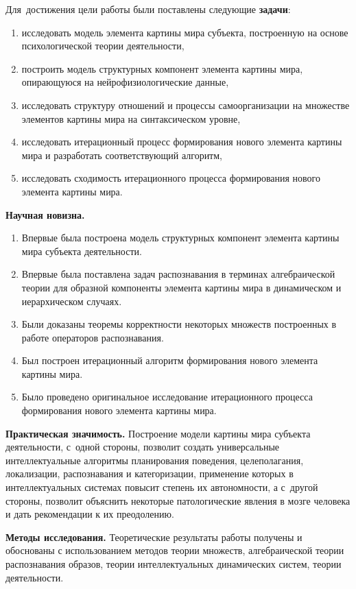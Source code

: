 Для~достижения цели работы были поставлены следующие \textbf{задачи}:
\begin{enumerate}
  \item исследовать модель элемента картины мира субъекта, построенную на основе психологической теории деятельности,
  \item построить модель структурных компонент элемента картины мира, опирающуюся на нейрофизиологические данные,
  \item исследовать структуру отношений и процессы самоорганизации на множестве элементов картины мира на синтаксическом уровне,
  \item исследовать итерационный процесс формирования нового элемента картины мира и разработать соответствующий алгоритм,
  \item исследовать сходимость итерационного процесса формирования нового элемента картины мира.
\end{enumerate}

\textbf{Научная новизна.}
\begin{enumerate}
	\renewcommand\labelenumi{\theenumi.}
  \item Впервые была построена модель структурных компонент элемента картины мира субъекта деятельности.
  \item Впервые была поставлена задач распознавания в терминах алгебраической теории для образной компоненты элемента картины мира в динамическом и иерархическом случаях.
  \item Были доказаны теоремы корректности некоторых множеств построенных в работе операторов распознавания.
  \item Был построен итерационный алгоритм формирования нового элемента картины мира.
  \item Было проведено оригинальное исследование итерационного процесса формирования нового элемента картины мира.
\end{enumerate}

\textbf{Практическая значимость.} Построение модели картины мира субъекта деятельности, с~одной стороны, позволит создать универсальные интеллектуальные алгоритмы планирования поведения, целеполагания, локализации, распознавания и категоризации, применение которых в интеллектуальных системах повысит степень их автономности, а с~другой стороны, позволит объяснить некоторые патологические явления в мозге человека и дать рекомендации к их преодолению.

\textbf{Методы исследования.} Теоретические результаты работы получены и обоснованы с использованием методов теории множеств, алгебраической теории распознавания образов, теории интеллектуальных динамических систем, теории деятельности.


